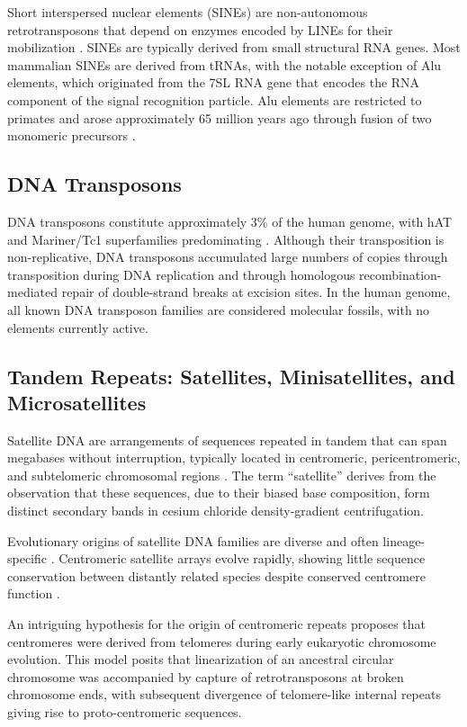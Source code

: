 Short interspersed nuclear elements (SINEs) are non-autonomous retrotransposons that depend on enzymes encoded by LINEs for their mobilization \parencite{dewannieux2003}. SINEs are typically derived from small structural RNA genes. Most mammalian SINEs are derived from tRNAs, with the notable exception of Alu elements, which originated from the 7SL RNA gene that encodes the RNA component of the signal recognition particle. Alu elements are restricted to primates and arose approximately 65 million years ago through fusion of two monomeric precursors \parencite{batzer2002}.

\subsection{DNA Transposons}

DNA transposons constitute approximately 3\% of the human genome, with hAT and Mariner/Tc1 superfamilies predominating \parencite{cordaux2009}. Although their transposition is non-replicative, DNA transposons accumulated large numbers of copies through transposition during DNA replication and through homologous recombination-mediated repair of double-strand breaks at excision sites. In the human genome, all known DNA transposon families are considered molecular fossils, with no elements currently active.

\subsection{Tandem Repeats: Satellites, Minisatellites, and Microsatellites}

Satellite DNA are arrangements of sequences repeated in tandem that can span megabases without interruption, typically located in centromeric, pericentromeric, and subtelomeric chromosomal regions \parencite{garrido-ramos2017}. The term ``satellite'' derives from the observation that these sequences, due to their biased base composition, form distinct secondary bands in cesium chloride density-gradient centrifugation.

Evolutionary origins of satellite DNA families are diverse and often lineage-specific \parencite{plohl2012}. Centromeric satellite arrays evolve rapidly, showing little sequence conservation between distantly related species despite conserved centromere function \parencite{henikoff2001,malik2009}.

An intriguing hypothesis for the origin of centromeric repeats proposes that centromeres were derived from telomeres during early eukaryotic chromosome evolution. This model posits that linearization of an ancestral circular chromosome was accompanied by capture of retrotransposons at broken chromosome ends, with subsequent divergence of telomere-like internal repeats giving rise to proto-centromeric sequences.

